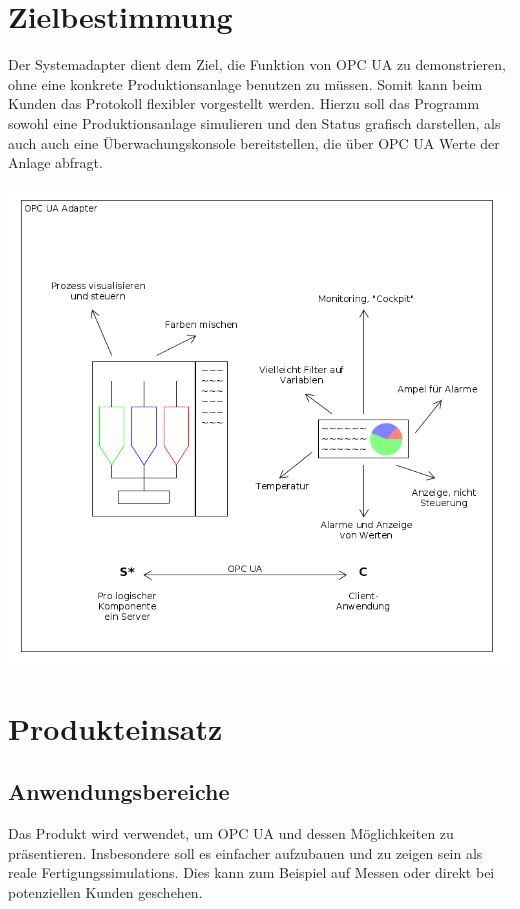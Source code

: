 \documentclass[parskip=full]{scrartcl}
\begin{document}
\section{Zielbestimmung}
Der \gls{Systemadapter} dient dem Ziel, die Funktion von \gls{OPC UA} zu demonstrieren, ohne eine konkrete \gls{Produktionsanlage}
benutzen zu müssen. Somit kann beim Kunden das Protokoll flexibler vorgestellt werden. Hierzu soll das Programm
sowohl eine \gls{Produktionsanlage} simulieren und den Status grafisch darstellen, als auch auch eine Überwachungskonsole
bereitstellen, die über OPC UA Werte der Anlage abfragt.\\
\begin{center}
    \includegraphics[scale=0.5]{../system-sketch.png}
\end{center}

\newpage
\section{Produkteinsatz}
\subsection{Anwendungsbereiche}
Das Produkt wird verwendet, um \gls{OPC UA} und dessen Möglichkeiten zu präsentieren.
Insbesondere soll es einfacher aufzubauen und zu zeigen sein als reale \glspl{Fertigungssimulation}.
Dies kann zum Beispiel auf Messen oder direkt bei potenziellen Kunden geschehen.
\end{document}
